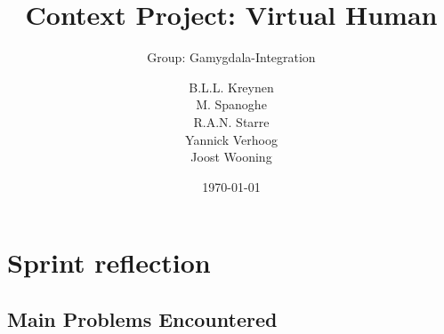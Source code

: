 \documentclass{scrartcl}
\begin{document}
\title{Context Project: Virtual Human}
\subtitle{Group: Gamygdala-Integration}
\date{\today{}}

\author{
    \begin{tabular}{l r}
      B.L.L. Kreynen\\
      M. Spanoghe\\
      R.A.N. Starre\\
      Yannick Verhoog\\
      Joost Wooning\\
    \end{tabular}
}

\maketitle \thispagestyle{empty} \pagebreak

\section{Sprint reflection}

\subsection{Main Problems Encountered}
\end{document}
